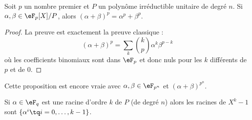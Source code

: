 \begin{lemma}       \label{LemZrUUOz}
	Soit \( p\) un nombre premier et \( P\) un polynôme irréductible unitaire de degré \( n\). Si \( \alpha,\beta\in \eF_p[X]/P\), alors \( (\alpha+\beta)^p=\alpha^p+\beta^p\).
\end{lemma}

\begin{proof}
	La preuve est exactement la preuve classique :
	\begin{equation}
		(\alpha+\beta)^p=\sum_k{k\choose p} \alpha^k\beta^{p-k}
	\end{equation}
	où les coefficients binomiaux sont dans \( \eF_p\) et donc nuls pour les \( k\) différents de \( p\) et de \( 0\).
\end{proof}
Cette proposition est encore vraie avec \( \alpha,\beta\in\eF_{p^n}\) et \( (\alpha+\beta)^{p^n}\).

\begin{lemma}
	Si \( \alpha\in \eF_q\) est une racine d'ordre \( k\) de \( P\) (de degré \( n\)) alors les racines de \( X^k-1\) sont \( \{ \alpha^i\tq i=0,\ldots, k-1 \}\).
\end{lemma}

